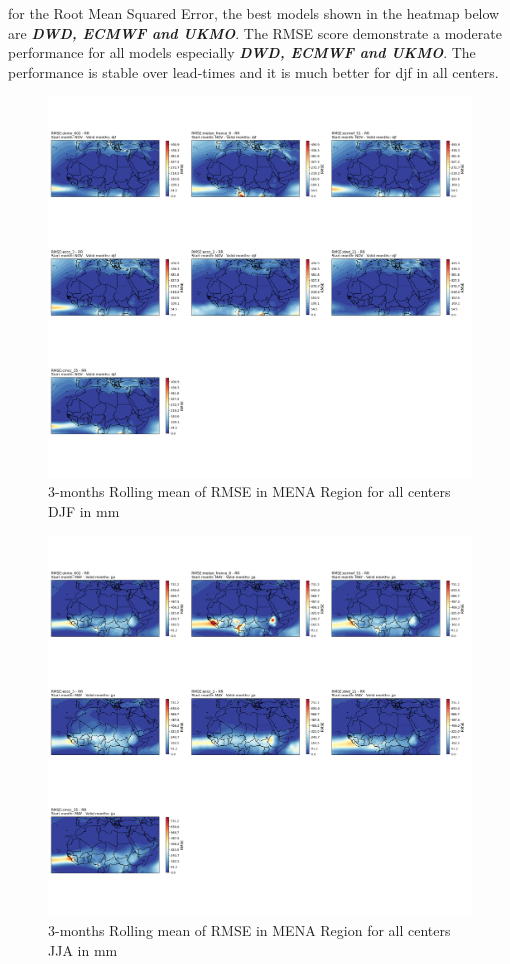 for the Root Mean Squared Error, the best models shown in the heatmap below are \textbf{\textit{DWD, ECMWF and UKMO}}. The RMSE score demonstrate a moderate performance for all models especially \textbf{\textit{DWD, ECMWF and UKMO}}. The performance is stable over lead-times and it is much better for djf in all centers.

\begin{figure}[H]
\centering
\includegraphics[scale=0.3]{plots/det/rmse/rmse_djf_RR.png}
\caption{3-months Rolling mean of RMSE in MENA Region for all centers DJF in mm}
\end{figure}

\begin{figure}[H]
\centering
\includegraphics[scale=0.3]{plots/det/rmse/rmse_jja_RR.png}
\caption{3-months Rolling mean of RMSE in MENA Region for all centers JJA in mm}
\end{figure}

